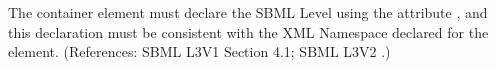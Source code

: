 The  container element must declare the SBML Level
using the attribute , and this declaration must be
consistent with the XML Namespace declared for the 
element.  (References: SBML L3V1 Section 4.1; SBML L3V2 .)
